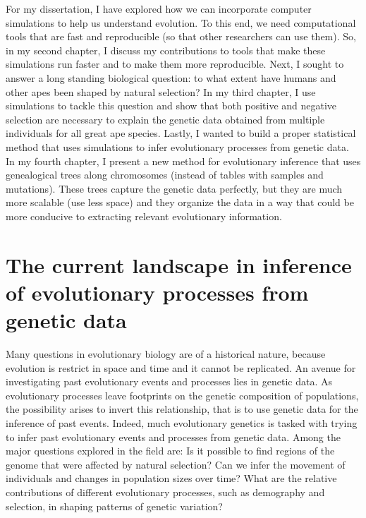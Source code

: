For my dissertation, I have explored how we can incorporate computer simulations to help us understand evolution.
To this end, we need computational tools that are fast and reproducible (so that other researchers can use them).
So, in my second chapter, I discuss my contributions to tools that make these simulations run faster and to make them more reproducible.
Next, I sought to answer a long standing biological question: to what extent have humans and other apes been shaped by natural selection?
In my third chapter, I use simulations to tackle this question and show that both positive and negative selection are necessary to explain the genetic data obtained from multiple individuals for all great ape species.
Lastly, I wanted to build a proper statistical method that uses simulations to infer evolutionary processes from genetic data.
In my fourth chapter, I present a new method for evolutionary inference that uses genealogical trees along chromosomes
(instead of tables with samples and mutations).
These trees capture the genetic data perfectly, but they are much more scalable (use less space) and
they organize the data in a way that could be more conducive to extracting relevant evolutionary information.

\section{The current landscape in inference of evolutionary processes from genetic data}

Many questions in evolutionary biology are of a historical nature,
because evolution is restrict in space and time and it cannot be replicated.
An avenue for investigating past evolutionary events and processes lies in genetic data.
As evolutionary processes leave footprints on the genetic composition of populations,
the possibility arises to invert this relationship,
that is to use genetic data for the inference of past events.
Indeed, much evolutionary genetics is tasked with trying to infer past evolutionary events and processes from genetic data.
Among the major questions explored in the field are: 
Is it possible to find regions of the genome that were affected by natural selection?
Can we infer the movement of individuals and changes in population sizes over time?
What are the relative contributions of different evolutionary processes, such as demography and selection, in shaping patterns of genetic variation? 

